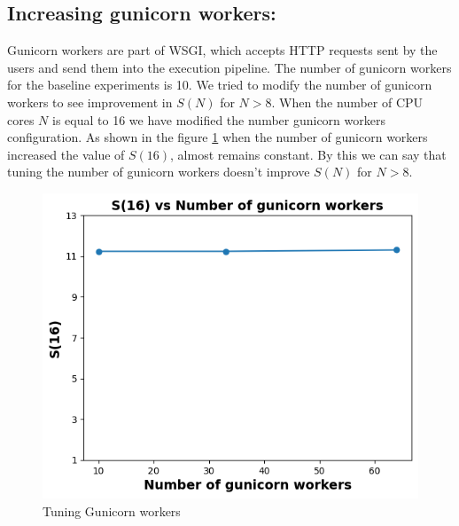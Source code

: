 \documentclass[sigconf]{acmart}
\begin{document}
\subsection{Increasing gunicorn workers:}
Gunicorn workers are part of WSGI, which accepts HTTP requests sent by the users and send them into the execution pipeline. The number of gunicorn workers for the baseline experiments is 10. We tried to modify the number of gunicorn workers to see improvement in $S(N)$ for $N>8$. When the number of CPU cores $N$ is equal to 16 we have modified the number gunicorn workers configuration. As shown in the figure \ref{gunicorn_plot} when the number of gunicorn workers increased the value of $S(16)$, almost remains constant. By this we can say that tuning the number of gunicorn workers doesn't improve  $S(N)$ for $N>8$.
\begin{figure}[!htb]
  \centering
  \includegraphics[width=\linewidth]{Pictures/gunicorn_workers.png}
  \caption{Tuning Gunicorn workers}
  \label{gunicorn_plot}
\end{figure}
\end{document}
